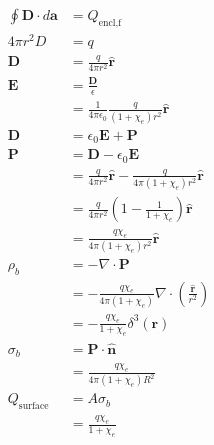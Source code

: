 \documentclass{article}
\renewcommand{\vec}[1]{\boldsymbol{\mathbf{#1}}}
\newcommand{\uvec}[1]{\hat{\vec{#1}}}
\newcommand{\ke}{\frac{1}{4 \pi \epsilon_0}}
\begin{document}
\begin{align*}
  \oint \vec{D} \cdot d \vec{a} & = Q_\text{encl,f}                                                                       \\
  4 \pi r^2 D                   & = q                                                                                     \\
  \vec{D}                       & = \frac{q}{4 \pi r^2} \uvec{r}                                                          \\
  \vec{E}                       & = \frac{\vec{D}}{\epsilon}                                                              \\
                                & = \ke \frac{q}{(1 + \chi_e) r^2} \uvec{r}                                               \\
  \vec{D}                       & = \epsilon_0 \vec{E} + \vec{P}                                                          \\
  \vec{P}                       & = \vec{D} - \epsilon_0 \vec{E}                                                          \\
                                & = \frac{q}{4 \pi r^2} \uvec{r} - \frac{q}{4 \pi (1 + \chi_e) r^2} \uvec{r}              \\
                                & = \frac{q}{4 \pi r^2} \left( 1 - \frac{1}{1 + \chi_e} \right) \uvec{r}                  \\
                                & = \frac{q \chi_e}{4 \pi (1 + \chi_e) r^2} \uvec{r}                                      \\
  \rho_b                        & = -\nabla \cdot \vec{P}                                                                 \\
                                & = -\frac{q \chi_e}{4 \pi (1 + \chi_e)} \nabla \cdot \left( \frac{\uvec{r}}{r^2} \right) \\
                                & = -\frac{q \chi_e}{1 + \chi_e} \delta^3(\vec{r})                                        \\
  \sigma_b                      & = \vec{P} \cdot \uvec{n}                                                                \\
                                & = \frac{q \chi_e}{4 \pi (1 + \chi_e) R^2}                                               \\
  Q_\text{surface}              & = A \sigma_b                                                                            \\
                                & = \frac{q \chi_e}{1 + \chi_e}
\end{align*}
\end{document}
